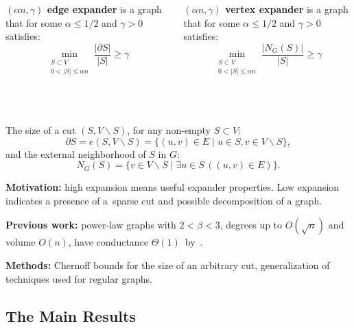 \documentclass{beamer}
\newcommand{\autotitle}{\secname\ifdefempty{\subsecname}{}{~--- \subsecname}}
\newcommand{\smalldisplayskips}{
    \setlength{\abovedisplayskip}{3pt}
    \setlength{\belowdisplayskip}{3pt}}
\begin{document}
\begin{frame}{\autotitle}
    \smalldisplayskips
    \begin{columns}[T,onlytextwidth]
        \textbf{$(\alpha n,\gamma)$ edge expander} is a graph
        that for some $\alpha\leq 1/2$ and $\gamma>0$ satisfies:
        \begin{equation*}
            \min_{\substack{S\subset V\\0<|S|\leq\alpha n}}\frac{|\partial S|}{|S|}\geq\gamma
        \end{equation*}
        
        \textbf{$(\alpha n,\gamma)$ vertex expander} is a graph
        that for some $\alpha\leq 1/2$ and $\gamma>0$ satisfies:
        \begin{equation*}
            \min_{\substack{S\subset V\\0<|S|\leq\alpha n}}\frac{|N_G(S)|}{|S|}\geq\gamma
        \end{equation*}
    \end{columns}
    ~\\~\\
    
    The size of a cut $(S,V\backslash S)$, for any non-empty $S\subset V$:
    \begin{equation*}
        \partial S=e(S,V\backslash S)=\{(u,v)\in E\;|\;u\in S,v\in V\backslash S\},
    \end{equation*}
    and the external neighborhood of $S$ in $G$:
    \begin{equation*}
        N_G(S)=\{v\in V\backslash S\;|\;\exists u\in S\,((u,v)\in E)\}.
    \end{equation*}
\end{frame}

\begin{frame}{\autotitle}
    \textbf{Motivation:} high expansion means useful expander properties.
    Low expansion indicates a presence of a~sparse cut and
    possible decomposition of a graph.
    
    \textbf{Previous work:} power-law graphs with $2<\beta<3$,
    degrees up to $O\left(\sqrt{n}\right)$ and volume $O(n)$,
    have conductance $\Theta(1)$~by~\cite{gms03}.
    
    \textbf{Methods:} Chernoff bounds for the size of an arbitrary cut,
    generalization of techniques used for regular graphs.
\end{frame}

\subsection{The Main Results}
\end{document}
